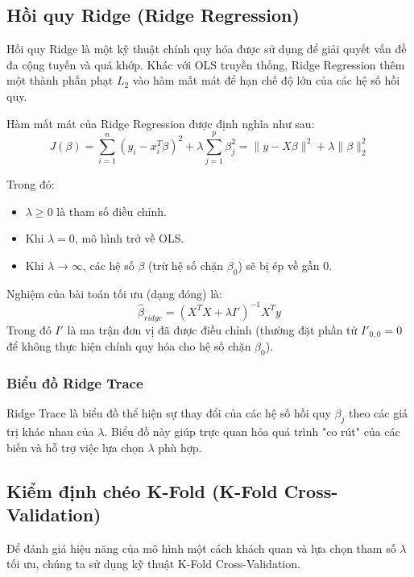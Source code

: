 \subsection{Hồi quy Ridge (Ridge Regression)}

Hồi quy Ridge là một kỹ thuật chính quy hóa được sử dụng để giải quyết vấn đề đa cộng tuyến và quá khớp. Khác với OLS truyền thống, Ridge Regression thêm một thành phần phạt $L_2$ vào hàm mất mát để hạn chế độ lớn của các hệ số hồi quy.

Hàm mất mát của Ridge Regression được định nghĩa như sau:
\begin{equation}
    J(\beta) = \sum_{i=1}^{n} (y_i - x_i^T \beta)^2 + \lambda \sum_{j=1}^{p} \beta_j^2 = \|y - X\beta\|^2 + \lambda \|\beta\|_2^2
\end{equation}

Trong đó:
\begin{itemize}
    \item $\lambda \ge 0$ là tham số điều chỉnh.
    \item Khi $\lambda = 0$, mô hình trở về OLS.
    \item Khi $\lambda \to \infty$, các hệ số $\beta$ (trừ hệ số chặn $\beta_0$) sẽ bị ép về gần 0.
\end{itemize}

Nghiệm của bài toán tối ưu (dạng đóng) là:
\begin{equation}
    \hat{\beta}_{ridge} = (X^T X + \lambda I')^{-1} X^T y
\end{equation}
Trong đó $I'$ là ma trận đơn vị đã được điều chỉnh (thường đặt phần tử $I'_{0,0} = 0$ để không thực hiện chính quy hóa cho hệ số chặn $\beta_0$).

\subsubsection{Biểu đồ Ridge Trace}
Ridge Trace là biểu đồ thể hiện sự thay đổi của các hệ số hồi quy $\beta_j$ theo các giá trị khác nhau của $\lambda$. Biểu đồ này giúp trực quan hóa quá trình "co rút" của các biến và hỗ trợ việc lựa chọn $\lambda$ phù hợp.

\subsection{Kiểm định chéo K-Fold (K-Fold Cross-Validation)}

Để đánh giá hiệu năng của mô hình một cách khách quan và lựa chọn tham số $\lambda$ tối ưu, chúng ta sử dụng kỹ thuật K-Fold Cross-Validation.

